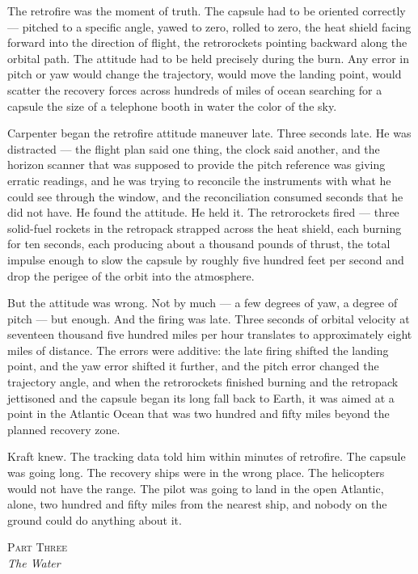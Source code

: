\documentclass[12pt, letterpaper]{article}
\begin{document}
The retrofire was the moment of truth. The capsule had to be oriented correctly --- pitched to a specific angle, yawed to zero, rolled to zero, the heat shield facing forward into the direction of flight, the retrorockets pointing backward along the orbital path. The attitude had to be held precisely during the burn. Any error in pitch or yaw would change the trajectory, would move the landing point, would scatter the recovery forces across hundreds of miles of ocean searching for a capsule the size of a telephone booth in water the color of the sky.

Carpenter began the retrofire attitude maneuver late. Three seconds late. He was distracted --- the flight plan said one thing, the clock said another, and the horizon scanner that was supposed to provide the pitch reference was giving erratic readings, and he was trying to reconcile the instruments with what he could see through the window, and the reconciliation consumed seconds that he did not have. He found the attitude. He held it. The retrorockets fired --- three solid-fuel rockets in the retropack strapped across the heat shield, each burning for ten seconds, each producing about a thousand pounds of thrust, the total impulse enough to slow the capsule by roughly five hundred feet per second and drop the perigee of the orbit into the atmosphere.

But the attitude was wrong. Not by much --- a few degrees of yaw, a degree of pitch --- but enough. And the firing was late. Three seconds of orbital velocity at seventeen thousand five hundred miles per hour translates to approximately eight miles of distance. The errors were additive: the late firing shifted the landing point, and the yaw error shifted it further, and the pitch error changed the trajectory angle, and when the retrorockets finished burning and the retropack jettisoned and the capsule began its long fall back to Earth, it was aimed at a point in the Atlantic Ocean that was two hundred and fifty miles beyond the planned recovery zone.

Kraft knew. The tracking data told him within minutes of retrofire. The capsule was going long. The recovery ships were in the wrong place. The helicopters would not have the range. The pilot was going to land in the open Atlantic, alone, two hundred and fifty miles from the nearest ship, and nobody on the ground could do anything about it.

\begin{center}
{\small\textsc{Part Three}}\\[0.3em]
{\large\textit{The Water}}
\end{center}
\end{document}
